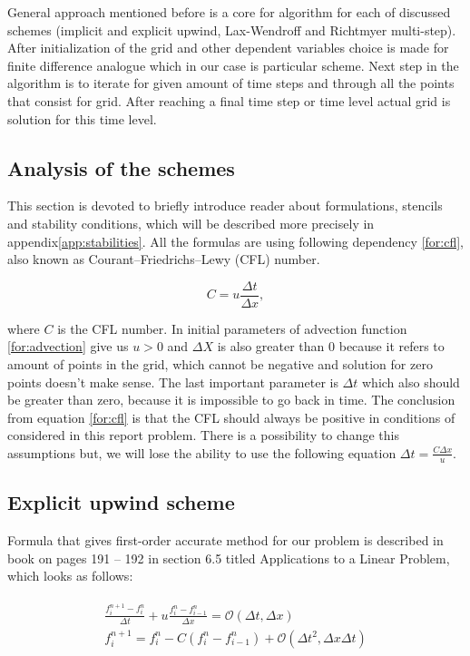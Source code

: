 	General approach mentioned before is a core for algorithm for each of discussed schemes (implicit and explicit upwind, Lax-Wendroff and Richtmyer multi-step). After initialization of the grid and other dependent variables choice is made for finite difference analogue which in our case is particular scheme. Next step in the algorithm is to iterate for given amount of time steps and through all the points that consist for grid. After reaching a final time step or time level actual grid is solution for this time level.
	
	\subsection{Analysis of the schemes} \label{sec:analysis}
		This section is devoted to briefly introduce reader about formulations, stencils and stability conditions, which will be described more precisely in appendix\ref{app:stabilities}. All the formulas are using following dependency \ref{for:cfl}, also known as Courant–Friedrichs–Lewy (CFL) number.
		
		\begin{equation}
			\label{for:cfl}
			C = u \frac{\Delta t}{\Delta x},
		\end{equation} 
		
		where $C$ is the CFL number. In initial parameters of advection function \ref{for:advection} give us $u > 0$ and $\Delta X$ is also greater than $0$ because it refers to amount of points in the grid, which cannot be negative and solution for zero points doesn't make sense. The last important parameter is $\Delta t$ which also should be greater than zero, because it is impossible to go back in time. The conclusion from equation \ref{for:cfl} is that the CFL should always be positive in conditions of considered in this report problem. There is a possibility to change this assumptions but, we will lose the ability to use the following equation $\Delta t = \frac{C\Delta x}{u}$.
		
	\subsection{Explicit upwind scheme} \label{sec:explicitUpwind}
		Formula that gives first-order accurate method for our problem is described in book\cite{bib:hoffman} on pages 191 -- 192 in section 6.5 titled Applications to a Linear Problem, which looks as follows:
		
		\begin{align}
			\label{for:explicitUpwind}
			\begin{split}
				\frac{f_i^{n+1} - f_i^n}{\Delta t} + u\frac{f_i^n - f_{i-1}^n}{\Delta x} = \mathcal{O}(\Delta t, \Delta x) \\
				f_i^{n+1} = f_i^n - C(f_i^n - f_{i-1}^n) + \mathcal{O}(\Delta t^2, \Delta x \Delta t)
			\end{split}
		\end{align}
		
